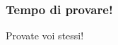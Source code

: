 \begin{frame}
 
  \frametitle{Tempo di provare!}
  
  \transdissolve %
  
  \begin{center}
    \Huge Provate voi stessi!
  \end{center}

  
\end{frame}
 
